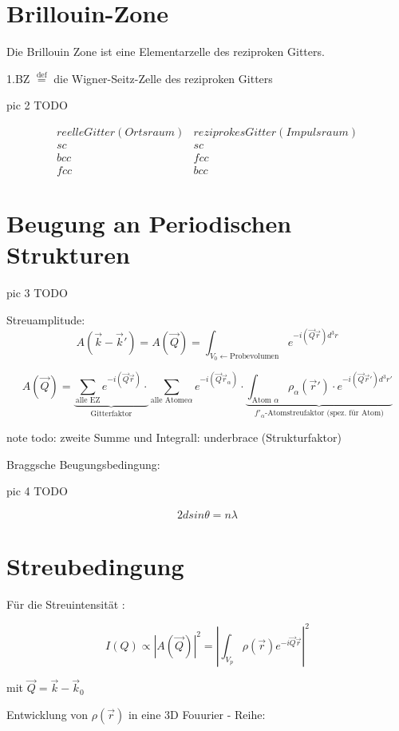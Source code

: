 \section{Brillouin-Zone}

Die Brillouin Zone ist eine Elementarzelle des reziproken Gitters. 

1.BZ \(\stackrel{\mathrm{def}}=\) die Wigner-Seitz-Zelle des reziproken Gitters

pic 2 TODO 

\[
\begin{array}{cc} reelle Gitter (Ortsraum)&reziprokes Gitter (Impulsraum)\\
sc&sc\\
bcc&fcc\\
fcc&bcc
\end{array}
\]



\section{Beugung an Periodischen Strukturen}

pic 3 TODO

Streuamplitude: 
\[A(\vec k -\vec k')=A(\vec Q)=\int_{V_0\leftarrow\text{Probevolumen}}e^{-i(\vec  Q\vec r) d^3r}\]

\[ A(\vec Q) = \underbrace{\sum_{\text{alle EZ}}e^{-i(\vec  Q\vec r)}\cdot}_{\text{Gitterfaktor}} \sum_{\text{alle
    Atome}\alpha}e^{-i(\vec  Q\vec r_\alpha)}\cdot \underbrace{\int_{\text{Atom }\alpha}
\rho_\alpha(\vec r')\cdot e^{-i(\vec  Q\vec
  r')d^3r'}}_{f'_\alpha\text{-Atomstreufaktor (spez. für Atom)}}\]



note todo: zweite Summe und Integrall: underbrace (Strukturfaktor)

Braggsche Beugungsbedingung:

pic 4 TODO

\[ 2dsin\theta=n\lambda\]


\section{Streubedingung}

Für die Streuintensität :

 \[I(Q) \propto | A(\vec
Q)|^2=|\int_{V_p}\rho(\vec r) e^{-i\vec Q\vec r}|^2\]

mit \(\vec Q = \vec k - \vec k_0\)

Entwicklung von \(\rho(\vec r)\) in eine 3D Fouurier - Reihe:

